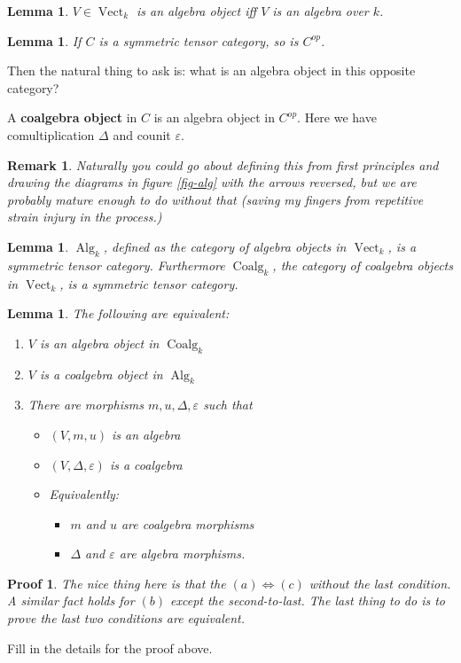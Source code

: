 \documentclass[12pt]{article}
\theoremstyle{nonumberbreak}
\theoremstyle{changebreak}
\newtheorem{lem}[thm]{Lemma}
\theoremstyle{break}
\theoremstyle{nonumberbreak}
\newtheorem{prf}{Proof}
\theoremstyle{nonumberplain}
\theoremstyle{change}
\newtheorem{rmk}[thm]{Remark}
\newcommand*{\Vectk}{\operatorname{Vect}_k}
\newcommand*{\Algk}{\operatorname{Alg}_k}
\newcommand*{\Coalgk}{\operatorname{Coalg}_k}
\begin{document}
\begin{lem}
	$V\in\Vectk$ is an algebra object iff $V$ is an algebra over $k$.
\end{lem}

\begin{lem}
	If $C$ is a symmetric tensor category, so is $C^{op}$.
\end{lem}

Then the natural thing to ask is: what is an algebra object in this opposite category?
\begin{defn}
	A \textbf{coalgebra object} in $C$ is an algebra object in $C^{op}$. Here we have 
	comultiplication $\Delta$ and counit $\varepsilon$.
\end{defn}
\begin{rmk}
	Naturally you could go about defining this from first principles and drawing the diagrams
	in figure \ref{fig-alg} with the arrows reversed, but we are probably mature enough
	to do without that (saving my fingers from repetitive strain injury in the process.)
\end{rmk}

\begin{lem}
	$\Algk$, defined as the category of algebra objects in $\Vectk$, is a symmetric tensor category. Furthermore
	$\Coalgk$, the category of coalgebra objects in $\Vectk$, is a symmetric tensor category.
\end{lem}

\begin{lem}
	The following are equivalent:
	\begin{enumerate}
		\item $V$ is an algebra object in $\Coalgk$
		\item $V$ is a coalgebra object in $\Algk$
		\item There are morphisms $m,u,\Delta,\varepsilon$ such that
		\begin{itemize}
			\item $(V,m,u)$ is an algebra
			\item $(V,\Delta,\varepsilon)$ is a coalgebra
			\item Equivalently:
			\begin{itemize}
				\item $m$ and $u$ are coalgebra morphisms
				\item $\Delta$ and $\varepsilon$ are algebra morphisms.
			\end{itemize}
		\end{itemize}
	\end{enumerate}
\end{lem}
\begin{prf}
	The nice thing here is that the $(a)\Leftrightarrow (c)$ without the last condition. A similar fact holds
	for $(b)$ except the second-to-last. The last thing to do is to prove the last two conditions are equivalent.
\end{prf}
\begin{prob}
	Fill in the details for the proof above.
\end{prob}
\end{document}

